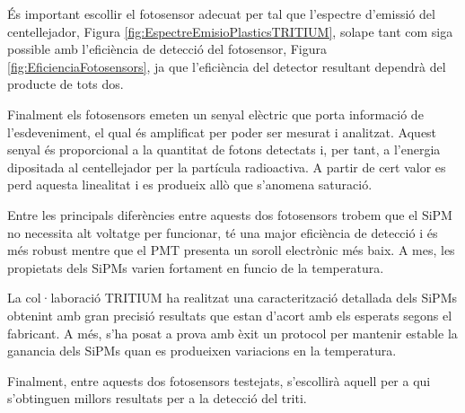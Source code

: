 És important escollir el fotosensor adecuat per tal que l'espectre d'emissió del centellejador, Figura \ref{fig:EspectreEmisioPlasticsTRITIUM}, solape tant com siga possible amb l'eficiència de detecció del fotosensor, Figura \ref{fig:EficienciaFotosensors}, ja que l'eficiència del detector resultant dependrà del producte de tots dos.

Finalment els fotosensors emeten un senyal elèctric que porta informació de l'esdeveniment, el qual és amplificat per poder ser mesurat i analitzat. Aquest senyal és proporcional a la quantitat de fotons detectats i, per tant, a l'energia dipositada al centellejador per la partícula radioactiva. A partir de cert valor es perd aquesta linealitat i es produeix allò que s'anomena saturació.

Entre les principals diferències entre aquests dos fotosensors trobem que el SiPM no necessita alt voltatge per funcionar, té una major eficiència de detecció i és més robust mentre que el PMT presenta un soroll electrònic més baix. A mes, les propietats dels SiPMs varien fortament en funcio de la temperatura.

La col·laboració TRITIUM ha realitzat una caracterització detallada dels SiPMs obtenint amb gran precisió resultats que estan d'acort amb els esperats segons el fabricant. A més, s'ha posat a prova amb èxit un protocol per mantenir estable la ganancia dels SiPMs quan es produeixen variacions en la temperatura.

Finalment, entre aquests dos fotosensors testejats, s'escollirà aquell per a qui s'obtinguen millors resultats per a la detecció del triti.